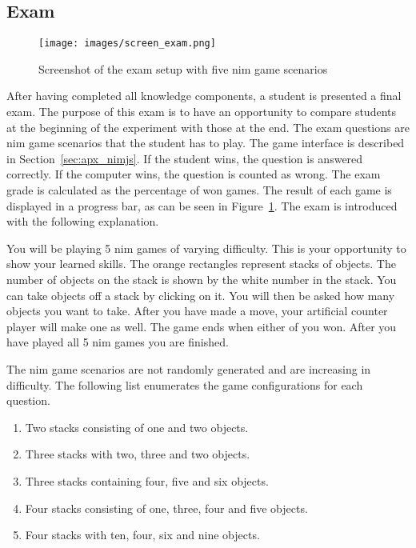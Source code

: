 \subsection{Exam}
\label{sec:setup_exam}
\begin{figure}[ht]
    \centering
    \texttt{[image: images/screen\_exam.png]}
    \caption{Screenshot of the exam setup with five nim game scenarios}
    \label{fig:screen_exam}
\end{figure}
\noindent
After having completed all knowledge components, a student is presented a final
exam. The purpose of this exam is to have an opportunity to compare students at
the beginning of the experiment with those at the end. The exam questions are
nim game scenarios that the student has to play. The game interface is
described in Section~\ref{sec:apx_nimjs}. If the student wins, the
question is answered correctly. If the computer wins, the question is counted
as wrong. The exam grade is calculated as the percentage of won games. The result
of each game is displayed in a progress bar, as can be seen in
Figure~\ref{fig:screen_exam}. The exam is introduced with the following explanation.
\begin{framed}\noindent
	You will be playing 5 nim games of varying difficulty. This is your
	opportunity to show your learned skills. The orange rectangles represent
	stacks of objects. The number of objects on the stack is shown by the white
	number in the stack. You can take objects off a stack by clicking on it.
	You will then be asked how many objects you want to take. After you have
	made a move, your artificial counter player will make one as well. The game
	ends when either of you won.
	After you have played all 5 nim games you are finished.
\end{framed}
\noindent The nim game scenarios are not randomly generated and are increasing in
difficulty. The following list enumerates the game configurations for each
question.
\begin{enumerate}
	\item Two stacks consisting of one and two objects.
	\item Three stacks with two, three and two objects.
	\item Three stacks containing four, five and six objects.
	\item Four stacks consisting of one, three, four and five objects.
	\item Four stacks with ten, four, six and nine objects.
\end{enumerate}
